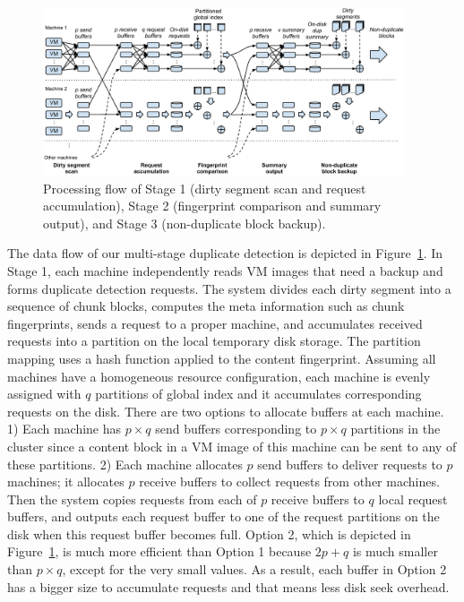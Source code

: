 \begin{figure}[tbhp]
\centering

\includegraphics[width=0.95\textwidth]{steps.pdf}
\caption{Processing flow of Stage  1 (dirty segment scan and request accumulation), Stage 2 
(fingerprint comparison and summary output),  and Stage 3 (non-duplicate block backup).}
\label{fig:flow}
\end{figure}

The data flow of our multi-stage duplicate detection is depicted in Figure~\ref{fig:flow}. 
In Stage 1, each machine independently reads  
VM images that need a backup
and forms duplicate  detection requests. 
The system divides  each dirty segment into a sequence of chunk blocks,  computes the meta 
information such as chunk fingerprints,  sends a request to a proper machine, and accumulates  
received requests into a partition on the local temporary disk storage. 
The partition mapping uses a hash function applied to the content fingerprint. 
Assuming all machines have a  homogeneous resource configuration, each machine is evenly  assigned with
$q$ partitions of global index and it accumulates corresponding requests on the disk. 
There are two options to allocate buffers at each machine. 
1) Each machine has  $p\times q$ send buffers corresponding to $p\times q$ partitions in the cluster
since a content block in a VM image of this machine can be sent to any of these partitions.
2) Each machine allocates $p$ send buffers to deliver requests to $p$ machines; it allocates 
$p$ receive buffers to collect requests  from other machines.
Then the system copies requests from each of $p$ receive buffers to  $q$ local request buffers,
and outputs each request buffer to one of the request partitions on the disk
when this request buffer becomes full.  Option 2, which is  depicted in Figure~\ref{fig:flow},
is much more efficient than Option 1 because $2p+q$ is much smaller than
$p\times q$, except for the very small  values. 
As a result, each buffer in Option 2 has a bigger size to accumulate requests and that means
less disk seek overhead.

